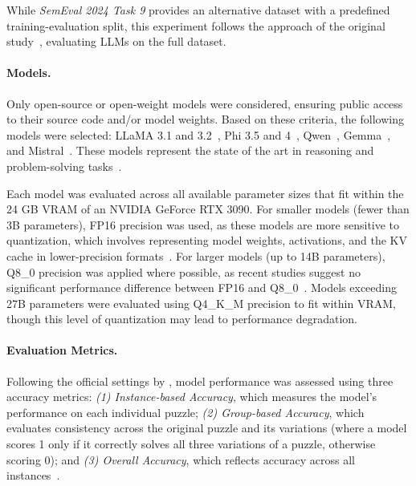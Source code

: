 While \textit{SemEval 2024 Task 9} provides an alternative dataset with a predefined training-evaluation split, this experiment follows the approach of the original study~\cite{jiangBRAINTEASERLateralThinking2023}, evaluating \acp{LLM} on the full dataset.

\paragraph{Models.}
Only open-source or open-weight models were considered, ensuring public access to their source code and/or model weights. Based on these criteria, the following models were selected: \ac{LLaMA} 3.1 and 3.2~\cite{grattafioriLlama3Herd2024}, \acs{Phi} 3.5 and 4~\cite{abdinPhi3TechnicalReport2024, abdinPhi4TechnicalReport2024}, \acs{Qwen}~\cite{qwenQwen25TechnicalReport2025}, \acs{Gemma}~\cite{teamGemma2Improving2024}, and \acs{Mistral}~\cite{MistralNeMoMistral}. These models represent the state of the art in reasoning and problem-solving tasks~\cite{grattafioriLlama3Herd2024, abdinPhi3TechnicalReport2024, abdinPhi4TechnicalReport2024, qwenQwen25TechnicalReport2025, teamGemma2Improving2024, MistralNeMoMistral}.

Each model was evaluated across all available parameter sizes that fit within the 24 GB \ac{VRAM} of an NVIDIA GeForce RTX 3090. For smaller models (fewer than 3B parameters), FP16 precision was used, as these models are more sensitive to quantization, which involves representing model weights, activations, and the KV cache in lower-precision formats~\cite{liEvaluatingQuantizedLarge2024}. For larger models (up to 14B parameters), Q8\_0 precision was applied where possible, as recent studies suggest no significant performance difference between FP16 and Q8\_0~\cite{raubaQuantifyingPerturbationImpacts2024, liEvaluatingQuantizedLarge2024}. Models exceeding 27B parameters were evaluated using Q4\_K\_M precision to fit within \ac{VRAM}, though this level of quantization may lead to performance degradation.

\paragraph{Evaluation Metrics.}
Following the official settings by \textcite{jiangBRAINTEASERLateralThinking2023}, model performance was assessed using three accuracy metrics: \textit{(1) Instance-based Accuracy}, which measures the model's performance on each individual puzzle; \textit{(2) Group-based Accuracy}, which evaluates consistency across the original puzzle and its variations (where a model scores 1 only if it correctly solves all three variations of a puzzle, otherwise scoring 0); and \textit{(3) Overall Accuracy}, which reflects accuracy across all instances~\cite{jiangBRAINTEASERLateralThinking2023}.


